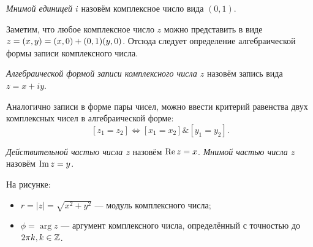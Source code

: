 \begin{definition}
\textit{Мнимой единицей \(i\)} назовём комплексное число вида \((0, 1)\).
\end{definition}

Заметим, что любое комплексное число \(z\) можно представить в виде \(z = (x, y) \hm= (x, 0) + (0, 1)
(y, 0)\). Отсюда следует определение алгебраической формы записи комплексного числа.

\begin{definition}
\textit{Алгебраической формой записи комплексного числа \(z\)} назовём запись вида \(z = x + i y\).
\end{definition}

Аналогично записи в форме пары чисел, можно ввести критерий равенства двух комплексных чисел в
алгебраической форме:
\[
    \left[z_1 = z_2\right] \iff \left[x_1 = x_2\right] \& \left[y_1 = y_2\right].
\]

\begin{definition}
\textit{Действительной частью числа \(z\)} назовём \(\operatorname{Re}{z} = x\). \textit{Мнимой частью числа
\(z\)} назовём \(\operatorname{Im}{z} = y\).
\end{definition}

\noindent
\begin{minipage}[c]{0.4\textwidth}
  \centering
\end{minipage}%
\hfill
\begin{minipage}[c]{0.6\textwidth}
На рисунке:
\begin{itemize}
\item \(r = |z| = \sqrt{x^2 + y^2}\) — модуль комплексного числа;
\item \(\phi = \arg z\) — аргумент комплексного числа, определённый с точностью до \(2\pi k, k \in
    \mathbb{Z}\).
\end{itemize}
\end{minipage}

